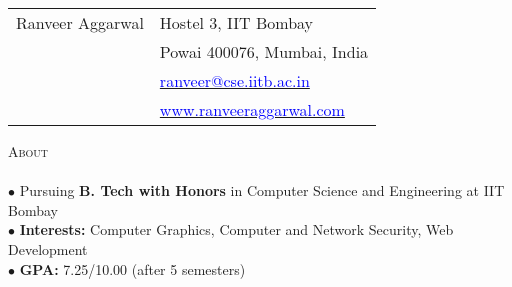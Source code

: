 \documentclass[a4paper,9pt]{article}
\begin{document}

\begin{tabularx}{\textwidth}{p{}>{\raggedleft\arraybackslash}p{}}
\textcolor{myrust}{\Huge{Ranveer Aggarwal}} & \textcolor{mydarkgray}{Hostel 3, IIT Bombay}\\
 & \textcolor{mydarkgray}{Powai 400076, Mumbai, India}\\
 & \href{mailto:ranveer@cse.iitb.ac.in}{\textcolor{blue}{ranveer@cse.iitb.ac.in}}\\
 & \href{http://www.ranveeraggarwal.com}{\textcolor{blue}{www.ranveeraggarwal.com}}\\
\end{tabularx}

\vspace{31pt}


\textcolor{myrust}{\large{\textsc{About}}}\textcolor{mygray}{\sout{\hfill}}\\\\
\small %
$\bullet$ Pursuing \textbf{B. Tech with Honors} in Computer Science and Engineering at IIT Bombay\\
$\bullet$ \textbf{Interests:} Computer Graphics, Computer and Network Security, Web Development\\
$\bullet$ \textbf{GPA:} 7.25/10.00 (after 5 semesters)\\\\
\end{document}
